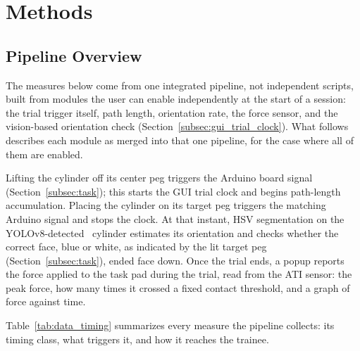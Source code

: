 \section{Methods}
\label{sec:methods}

\subsection{Pipeline Overview}
\label{subsec:pipeline_overview}

The measures below come from one integrated pipeline, not independent
scripts, built from modules the user can enable independently at the
start of a session: the trial trigger itself, path length, orientation
rate, the force sensor, and the vision-based orientation check
(Section~\ref{subsec:gui_trial_clock}). What follows describes each
module as merged into that one pipeline, for the case where all of
them are enabled.

Lifting the cylinder off its center peg triggers the Arduino
board signal (Section~\ref{subsec:task}); this starts the GUI trial
clock and begins path-length accumulation. Placing the cylinder on its
target peg triggers the matching Arduino signal and stops the clock. At
that instant, HSV segmentation on the YOLOv8-detected~\cite{yolov8} cylinder estimates
its orientation and checks whether the correct face, blue or white, as
indicated by the lit target peg (Section~\ref{subsec:task}), ended
face down. Once the trial ends, a popup reports the force applied to
the task pad during the trial, read from the ATI sensor: the peak
force, how many times it crossed a fixed contact threshold, and a
graph of force against time.

Table~\ref{tab:data_timing} summarizes every measure the pipeline
collects: its timing class, what triggers it, and how it reaches the
trainee.

